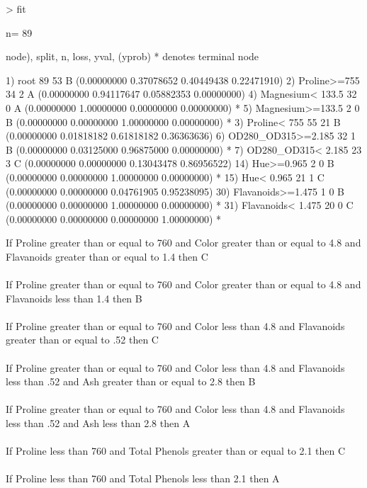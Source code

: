 \documentclass{article}
\begin{document}
\begin{Schunk}
\begin{Sinput}
> fit
\end{Sinput}
\begin{Soutput}
n= 89 

node), split, n, loss, yval, (yprob)
      * denotes terminal node

 1) root 89 53 B (0.00000000 0.37078652 0.40449438 0.22471910)  
   2) Proline>=755 34  2 A (0.00000000 0.94117647 0.05882353 0.00000000)  
     4) Magnesium< 133.5 32  0 A (0.00000000 1.00000000 0.00000000 0.00000000) *
     5) Magnesium>=133.5 2  0 B (0.00000000 0.00000000 1.00000000 0.00000000) *
   3) Proline< 755 55 21 B (0.00000000 0.01818182 0.61818182 0.36363636)  
     6) OD280_OD315>=2.185 32  1 B (0.00000000 0.03125000 0.96875000 0.00000000) *
     7) OD280_OD315< 2.185 23  3 C (0.00000000 0.00000000 0.13043478 0.86956522)  
      14) Hue>=0.965 2  0 B (0.00000000 0.00000000 1.00000000 0.00000000) *
      15) Hue< 0.965 21  1 C (0.00000000 0.00000000 0.04761905 0.95238095)  
        30) Flavanoids>=1.475 1  0 B (0.00000000 0.00000000 1.00000000 0.00000000) *
        31) Flavanoids< 1.475 20  0 C (0.00000000 0.00000000 0.00000000 1.00000000) *
\end{Soutput}
\end{Schunk}

\noindent
If Proline greater than or equal to 760 and Color greater than or equal to 4.8 and Flavanoids greater than or equal to 1.4 then C
\\
\\
\noindent
If Proline greater than or equal to 760 and Color greater than or equal to 4.8 and Flavanoids less than 1.4 then B
\\
\\
\noindent
If Proline greater than or equal to 760 and Color less than 4.8 and Flavanoids greater than or equal to .52 then C
\\
\\
\noindent
If Proline greater than or equal to 760 and Color less than 4.8 and Flavanoids less than .52 and Ash greater than or equal to 2.8 then B
\\
\\
\noindent
If Proline greater than or equal to 760 and Color less than 4.8 and Flavanoids less than .52 and Ash less than 2.8 then A
\\
\\
\noindent
If Proline less than 760 and  Total Phenols greater than or equal to 2.1 then C
\\
\\
\noindent
If Proline less than 760 and  Total Phenols less than 2.1 then A
\end{document}
